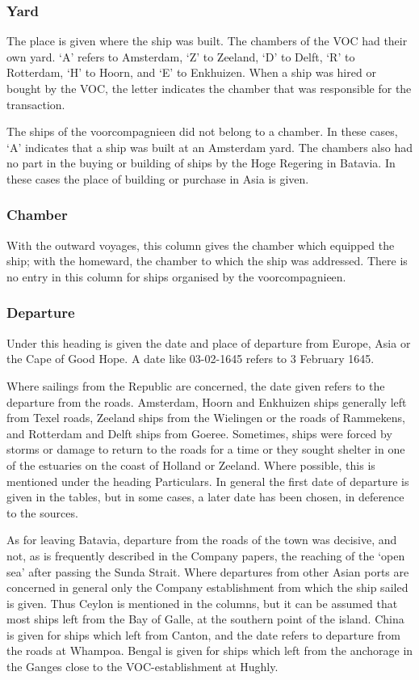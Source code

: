 \documentclass[10pt,twocolumn,fleqn]{article}
\begin{document}
\subsubsection*{Yard}

The place is given where the ship was built. The chambers of the VOC had 
their own yard. `A' refers to Amsterdam, `Z' to Zeeland, `D' to Delft, `R' 
to Rotterdam, `H' to Hoorn, and `E' to Enkhuizen. When a ship was hired 
or bought by the VOC, the letter indicates the chamber that was responsible 
for the transaction.

The ships of the voorcompagnieen did not belong to a chamber. In these 
cases, `A' indicates that a ship was built at an Amsterdam yard. 
The chambers also had no part in the buying or building of ships by 
the Hoge Regering in Batavia. In these cases the place of building 
or purchase in Asia is given.

\subsubsection*{Chamber}
With the outward voyages, this column gives the chamber which equipped the ship;
with the homeward, the chamber to which the ship was addressed.
There is no entry in this column for ships organised by the voorcompagnieen.

\subsubsection*{Departure}
Under this heading is given the date and place of departure from Europe, 
Asia or the Cape of Good Hope. A date like 03-02-1645 refers to 3 February 1645.

Where sailings from the Republic are concerned, the date given refers to 
the departure from the roads. Amsterdam, Hoorn and Enkhuizen ships generally 
left from Texel roads, Zeeland ships from the Wielingen or the 
roads of Rammekens, and Rotterdam and Delft ships from Goeree. 
Sometimes, ships were forced by storms or damage to return to the roads 
for a time or they sought shelter in one of the estuaries on the coast 
of Holland or Zeeland. Where possible, this is mentioned under the 
heading Particulars. In general the first date of departure is given in 
the tables, but in some cases, a later date has been chosen, in 
deference to the sources.

As for leaving Batavia, departure from the roads of the town was decisive, 
and not, as is frequently described in the Company papers, the reaching of 
the `open sea' after passing the Sunda Strait. Where departures from other 
Asian ports are concerned in general only the Company establishment 
from which the ship sailed is given. Thus Ceylon is mentioned in the columns, 
but it can be assumed that most ships left from the Bay of Galle, at 
the southern point of the island. China is given for ships which left from 
Canton, and the date refers to departure from the roads at Whampoa. 
Bengal is given for ships which left from the anchorage in the Ganges 
close to the VOC-establishment at Hughly.
\end{document}
